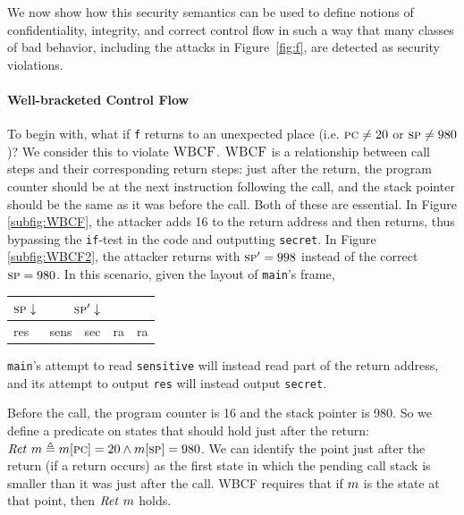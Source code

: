 \documentclass[10pt,conference]{ieeetran}%
\theoremstyle{definition}
\begin{document}
We now show how this security semantics can be used to define notions of confidentiality,
integrity, and correct control flow in such a way that many classes of
bad behavior, including the attacks in Figure~\ref{fig:f}, are
detected as security violations.

\paragraph*{Well-bracketed Control Flow}

To begin with, what if {\tt f} returns to an unexpected place (i.e. \(\textsc{pc} \neq 20\) or
\(\textsc{sp} \neq 980\))? We consider this to violate \(\textnormal{\sc WBCF}\). \(\textnormal{\sc WBCF}\) is a relationship between
call steps and their corresponding return steps: just after the return, the program
counter should be at the next instruction following the call,
and the stack pointer should be the same as it was before the call.
Both of these are essential. In Figure \ref{subfig:WBCF}, the attacker adds
16 to the return address and then returns, thus bypassing the {\tt if}-test in the code and outputting
{\tt secret}.
In Figure \ref{subfig:WBCF2}, the attacker returns with \(\textsc{sp}' = 998\) instead of the
correct \(\textsc{sp} = 980\). In this scenario, given the layout of {\tt main}'s frame,
\begin{center}
\begin{tabular}{| l | l | l | l | l |}
  \multicolumn{1}{r}{\(\textsc{sp} \downarrow\)} &
  \multicolumn{2}{r}{\(\textsc{sp}' \downarrow\)} \\
  \hline
  res & sens & sec & ra & ra \\
  \hline
\end{tabular}
\end{center}

\vspace{\abovedisplayskip}

\noindent
{\tt main}'s attempt to read {\tt sensitive} will instead
read part of the return address, and its attempt to output
{\tt res} will instead output {\tt secret}.

Before the call, the program counter is 16 and the stack pointer is 980.
So we define a predicate on states that should hold just after the return:
\(\mathit{Ret}\ m \triangleq m[\textsc{pc}] = 20 \wedge m[\textsc{sp}] = 980\).
%
We can identify the point just after the return (if a return occurs)
as the first state in which the pending call stack is smaller than it was
just after the call.
WBCF requires that if \(m\) is the state at that point, then \(\mathit{Ret} ~ m\) holds.
\end{document}
